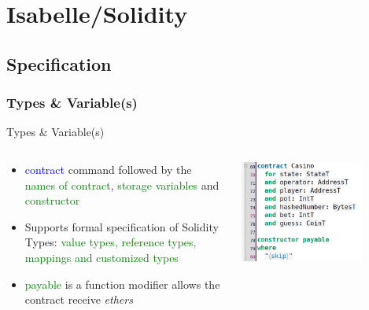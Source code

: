 \documentclass[aspectratio=169]{beamer}
\begin{document}
\section{Isabelle/Solidity}
\subsection{Specification}
\subsubsection{Types \& Variable(s) }
\begin{frame}{Types \& Variable(s)}
\begin{columns}
\begin{column}{0.5\textwidth}
  \begin{itemize}

\item \textcolor{blue}{contract} command followed by the \textcolor{green}{names of contract}, \textcolor{green}{storage variables} and \textcolor{green}{constructor}
\item Supports formal specification of Solidity Types: \textcolor{green}{value types, reference types, mappings and customized types}  

\item \textcolor{green}{payable} is a function modifier allows the contract receive \textit{ethers} 
\end{itemize}
\end{column}
\begin{column}{0.5\textwidth}  %
    \begin{center}
     \includegraphics[width=0.75\textwidth]{contract_storage.png}
     \end{center}
\end{column}
\end{columns}
\end{frame}
\end{document}
